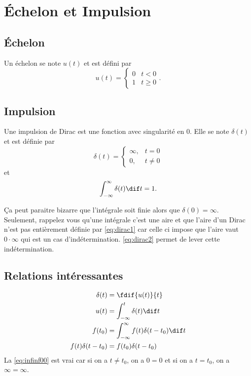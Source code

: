 \section{Échelon et Impulsion}
\subsection{Échelon}
Un échelon se note $u(t)$ et est défini par
\[ u(t) = \begin{cases}
    0 & t < 0\\
    1 & t \geq 0
\end{cases}. \]

\subsection{Impulsion}
\label{app:dirac}
Une impulsion de Dirac est une fonction avec singularité en 0.
Elle se note $\delta(t)$ et est définie par
\begin{equation}
  \label{eq:dirac1}
  \delta(t) =
  \begin{cases}
    \infty, & t = 0\\
    0, & t \neq 0
  \end{cases}
\end{equation}
et
\begin{equation}
  \label{eq:dirac2}
  \int_{-\infty}^{\infty} \delta(t) \dif t = 1.
\end{equation}

Ça peut paraitre bizarre que l'intégrale soit finie alors que
$\delta(0) = \infty$.
Seulement, rappelez vous qu'une intégrale c'est une aire et que
l'aire d'un Dirac n'est pas entièrement définie par \eqref{eq:dirac1}
car celle ci impose que l'aire vaut $0 \cdot \infty$ qui est un cas
d'indétermination.
\eqref{eq:dirac2} permet de lever cette indétermination.

\subsection{Relations intéressantes}
\begin{align}
  \nonumber
  \delta(t) & = \fdif{u(t)}{t}\\
  \label{eq:uintdelta}
  u(t) & = \int_{-\infty}^t \delta(t) \dif t\\
  \nonumber
  f(t_0) & = \int_{-\infty}^\infty f(t)\delta(t-t_0) \dif t\\
  \label{eq:infinf00}
  f(t) \delta(t-t_0) & = f(t_0)\delta(t-t_0)
\end{align}
La \eqref{eq:infinf00} est vrai car si on a $t \neq t_0$, on a $0 = 0$
et si on a $t = t_0$, on a $\infty = \infty$.

